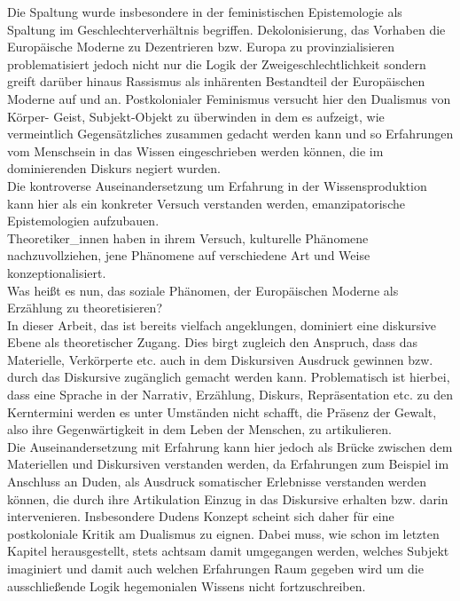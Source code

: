 \noindent Die Spaltung wurde insbesondere in der feministischen
Epistemologie als Spaltung im Geschlechterverhältnis begriffen.
Dekolonisierung, das Vorhaben die  Europäische Moderne zu Dezentrieren bzw.
Europa zu \glqq provinzialisieren\grqq\footnotemark
{} problematisiert jedoch nicht nur die Logik der
Zweigeschlechtlichkeit sondern greift darüber hinaus Rassismus als inhärenten
Bestandteil der Europäischen Moderne auf und an. Postkolonialer Feminismus
versucht hier den Dualismus von Körper- Geist, Subjekt-Objekt zu überwinden in
dem es aufzeigt, wie vermeintlich Gegensätzliches zusammen gedacht werden kann
und so Erfahrungen vom Menschsein in das Wissen eingeschrieben werden können,
die im dominierenden Diskurs negiert wurden. \\
Die kontroverse Auseinandersetzung
um Erfahrung in der Wissensproduktion kann hier als ein konkreter Versuch
verstanden werden, emanzipatorische Epistemologien aufzubauen.\\

\noindent Theoretiker\_innen haben in ihrem Versuch, kulturelle Phänomene
nachzuvollziehen, jene Phänomene auf verschiedene Art und Weise
konzeptionalisiert.\\
 Was heißt es nun, das soziale Phänomen, der Europäischen
Moderne als Erzählung zu theoretisieren?\\
In dieser Arbeit, das ist bereits vielfach angeklungen, dominiert eine
diskursive Ebene als theoretischer Zugang. Dies birgt zugleich den Anspruch,
dass das Materielle, Verkörperte etc. auch in dem Diskursiven Ausdruck gewinnen
bzw. durch das Diskursive zugänglich gemacht werden kann. Problematisch ist
hierbei, dass eine Sprache in der Narrativ, Erzählung, Diskurs, Repräsentation
etc. zu den Kerntermini werden es unter Umständen nicht schafft, die Präsenz
der Gewalt, also ihre Gegenwärtigkeit in dem Leben der Menschen, zu
artikulieren.\\

\noindent Die Auseinandersetzung mit Erfahrung kann hier jedoch als Brücke zwischen dem
Materiellen und Diskursiven verstanden werden, da Erfahrungen zum Beispiel im
Anschluss an Duden\footnotemark {}, als Ausdruck somatischer Erlebnisse verstanden werden
können, die durch ihre Artikulation Einzug in das Diskursive erhalten bzw.
darin intervenieren. Insbesondere Dudens Konzept scheint sich daher für eine
postkoloniale Kritik am Dualismus zu eignen. Dabei muss, wie schon im letzten
Kapitel herausgestellt, stets achtsam damit umgegangen werden, welches Subjekt
imaginiert und damit auch welchen Erfahrungen Raum gegeben wird um die
ausschließende Logik hegemonialen Wissens nicht fortzuschreiben.\\ 

